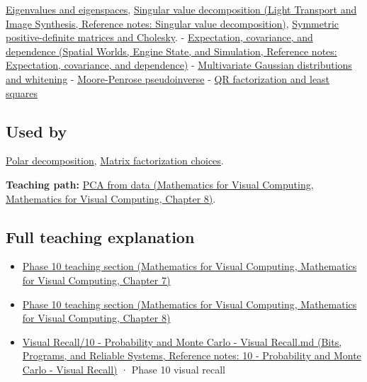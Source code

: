 \hyperref[appendix-0b3be18411f9]{Eigenvalues and eigenspaces}, \href{../04-Light-Transport-and-Image-Synthesis/main.pdf\#nameddest=appendix-1fad5e7f36fa}{Singular value decomposition (Light Transport and Image Synthesis, Reference notes: Singular value decomposition)}, \hyperref[appendix-50d2ea3c9b26]{Symmetric positive-definite matrices and Cholesky}. - \href{../05-Spatial-Worlds-Engine-State-and-Simulation/main.pdf\#nameddest=appendix-54c383df9992}{Expectation, covariance, and dependence (Spatial Worlds, Engine State, and Simulation, Reference notes: Expectation, covariance, and dependence)} - \hyperref[appendix-12bbe185dbe5]{Multivariate Gaussian distributions and whitening} - \hyperref[appendix-541306fdbc1b]{Moore-Penrose pseudoinverse} - \hyperref[appendix-c3421e6b4f2c]{QR factorization and least squares}

\subsection{Used by}\label{appendix-ad175ef3c5bf-used-by}

\hyperref[appendix-73f5bcf7a462]{Polar decomposition}, \hyperref[appendix-221a483bec2d]{Matrix factorization choices}.

\textbf{Teaching path:} \href{../02-Mathematics-for-Visual-Computing/main.pdf\#nameddest=02-foundations-ii-ch024-pca-turns-a-cloud-of-points-into-measured-variation}{PCA from data (Mathematics for Visual Computing, Mathematics for Visual Computing, Chapter 8)}.

\subsection{Full teaching explanation}\label{appendix-ad175ef3c5bf-full-teaching-explanation}

\begin{itemize}
\tightlist
\item
  \href{../02-Mathematics-for-Visual-Computing/main.pdf\#nameddest=02-foundations-ii-ch023-expected-values-describe-centers-covariance-describes-dependence}{Phase 10 teaching section (Mathematics for Visual Computing, Mathematics for Visual Computing, Chapter 7)}
\item
  \href{../02-Mathematics-for-Visual-Computing/main.pdf\#nameddest=02-foundations-ii-ch024-waiting-times-event-counts-and-covariance-geometry}{Phase 10 teaching section (Mathematics for Visual Computing, Mathematics for Visual Computing, Chapter 8)}
\item
  \href{../01-Bits-Programs-and-Reliable-Systems/main.pdf\#nameddest=appendix-cb5af353ef77}{Visual Recall/10 - Probability and Monte Carlo - Visual Recall.md (Bits, Programs, and Reliable Systems, Reference notes: 10 - Probability and Monte Carlo - Visual Recall)} · Phase 10 visual recall
\end{itemize}
